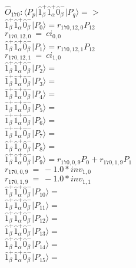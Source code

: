 \documentclass[14pt]{article}
\begin{document}
    $\hat{O}_{170}:  \langle{P_p}\vert \hat{1}_{\beta}^{+}\hat{1}_{\alpha}^{+}\hat{0}_{\beta}^{-} \vert{P_q}\rangle => $ \\ 
    $ \hat{1}_{\beta}^{+}\hat{1}_{\alpha}^{+}\hat{0}_{\beta}^{-} \vert{P_{0}}\rangle = {r}_{170,12,0}P_{12} $ \\ 
    ${r}_{170,12,0}\ =\ {ci}_{0,0} $ \\ 
    $ \hat{1}_{\beta}^{+}\hat{1}_{\alpha}^{+}\hat{0}_{\beta}^{-} \vert{P_{1}}\rangle = {r}_{170,12,1}P_{12} $ \\ 
    ${r}_{170,12,1}\ =\ {ci}_{1,0} $ \\ 
    $ \hat{1}_{\beta}^{+}\hat{1}_{\alpha}^{+}\hat{0}_{\beta}^{-} \vert{P_{2}}\rangle =  $ \\ 
    $ \hat{1}_{\beta}^{+}\hat{1}_{\alpha}^{+}\hat{0}_{\beta}^{-} \vert{P_{3}}\rangle =  $ \\ 
    $ \hat{1}_{\beta}^{+}\hat{1}_{\alpha}^{+}\hat{0}_{\beta}^{-} \vert{P_{4}}\rangle =  $ \\ 
    $ \hat{1}_{\beta}^{+}\hat{1}_{\alpha}^{+}\hat{0}_{\beta}^{-} \vert{P_{5}}\rangle =  $ \\ 
    $ \hat{1}_{\beta}^{+}\hat{1}_{\alpha}^{+}\hat{0}_{\beta}^{-} \vert{P_{6}}\rangle =  $ \\ 
    $ \hat{1}_{\beta}^{+}\hat{1}_{\alpha}^{+}\hat{0}_{\beta}^{-} \vert{P_{7}}\rangle =  $ \\ 
    $ \hat{1}_{\beta}^{+}\hat{1}_{\alpha}^{+}\hat{0}_{\beta}^{-} \vert{P_{8}}\rangle =  $ \\ 
    $ \hat{1}_{\beta}^{+}\hat{1}_{\alpha}^{+}\hat{0}_{\beta}^{-} \vert{P_{9}}\rangle = {r}_{170,0,9}P_{0}+{r}_{170,1,9}P_{1} $ \\ 
    ${r}_{170,0,9}\ =\ -1.0*{inv}_{1,0} $ \\ 
    ${r}_{170,1,9}\ =\ -1.0*{inv}_{1,1} $ \\ 
    $ \hat{1}_{\beta}^{+}\hat{1}_{\alpha}^{+}\hat{0}_{\beta}^{-} \vert{P_{10}}\rangle =  $ \\ 
    $ \hat{1}_{\beta}^{+}\hat{1}_{\alpha}^{+}\hat{0}_{\beta}^{-} \vert{P_{11}}\rangle =  $ \\ 
    $ \hat{1}_{\beta}^{+}\hat{1}_{\alpha}^{+}\hat{0}_{\beta}^{-} \vert{P_{12}}\rangle =  $ \\ 
    $ \hat{1}_{\beta}^{+}\hat{1}_{\alpha}^{+}\hat{0}_{\beta}^{-} \vert{P_{13}}\rangle =  $ \\ 
    $ \hat{1}_{\beta}^{+}\hat{1}_{\alpha}^{+}\hat{0}_{\beta}^{-} \vert{P_{14}}\rangle =  $ \\ 
    $ \hat{1}_{\beta}^{+}\hat{1}_{\alpha}^{+}\hat{0}_{\beta}^{-} \vert{P_{15}}\rangle =  $ \\ 
    
\end{document}
